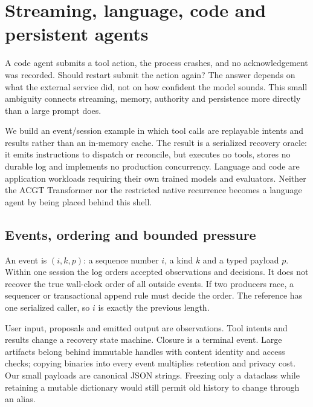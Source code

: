 \chapter{Streaming, language, code and persistent agents}
\label{evod49:chapter}
A code agent submits a tool action, the process crashes, and no acknowledgement
was recorded. Should restart submit the action again? The answer depends on
what the external service did, not on how confident the model sounds. This
small ambiguity connects streaming, memory, authority and persistence more
directly than a large prompt does.

We build an event/session example in which tool calls are replayable intents and
results rather than an in-memory cache. The result is a serialized recovery
oracle: it emits instructions to dispatch or reconcile, but executes no tools,
stores no durable log and implements no production concurrency. Language and code
are application workloads requiring their own trained models and evaluators.
Neither the ACGT Transformer nor the restricted native recurrence becomes a
language agent by being placed behind this shell.

\section{Events, ordering and bounded pressure}
An event is $(i,k,p)$: a sequence number $i$, a kind $k$ and a typed payload
$p$. Within one session the log orders accepted observations and decisions.
It does not recover the true wall-clock order of all outside events. If two
producers race, a sequencer or transactional append rule must decide the order.
The reference has one serialized caller, so $i$ is exactly the previous length.

User input, proposals and emitted output are observations. Tool intents and
results change a recovery state machine. Closure is a terminal event. Large
artifacts belong behind immutable handles with content identity and access
checks; copying binaries into every event multiplies retention and privacy cost.
Our small payloads are canonical JSON strings. Freezing only a dataclass while
retaining a mutable dictionary would still permit old history to change through
an alias.

